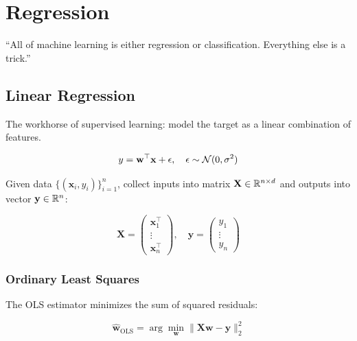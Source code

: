 \chapter{Regression}
\label{ch:regression}

\epigraph{``All of machine learning is either regression or classification. Everything else is a trick.''}{}


\section{Linear Regression}

The workhorse of supervised learning: model the target as a linear combination of features.

\[
	y = \mathbf{w}^\top \mathbf{x} + \epsilon, \quad \epsilon \sim \mathcal{N}(0, \sigma^2)
\]

Given data $\{(\mathbf{x}_i, y_i)\}_{i=1}^n$, collect inputs into matrix $\mathbf{X} \in \mathbb{R}^{n \times d}$ and outputs into vector $\mathbf{y} \in \mathbb{R}^n$:

\[
	\mathbf{X} = \begin{pmatrix}
		\mathbf{x}_1^\top \\
		\vdots            \\
		\mathbf{x}_n^\top
	\end{pmatrix}, \quad
	\mathbf{y} = \begin{pmatrix} y_1 \\ \vdots \\ y_n \end{pmatrix}
\]

\subsection{Ordinary Least Squares}

The OLS estimator minimizes the sum of squared residuals:

\[
	\hat{\mathbf{w}}_{\text{OLS}} = \arg\min_{\mathbf{w}} \|\mathbf{X}\mathbf{w} - \mathbf{y}\|_2^2
\]

